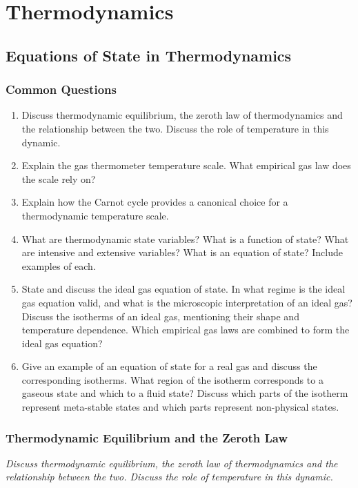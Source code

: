 \documentclass[11pt, a4paper]{article}
\begin{document}
\fi
\newpage

\pagestyle{headerstyle}
\section{Thermodynamics}

\subsection{Equations of State in Thermodynamics}
\subsubsection{Common Questions}
\begin{enumerate}
    \item Discuss thermodynamic equilibrium, the zeroth law of thermodynamics and the relationship between the two. Discuss the role of temperature in this dynamic. 
    \item Explain the gas thermometer temperature scale. What empirical gas law does the scale rely on?

    \item Explain how the Carnot cycle provides a canonical choice for a thermodynamic temperature scale.

    \item What are thermodynamic state variables? What is a function of state? What are intensive and extensive variables? What is an equation of state? Include examples of each.

    \item State and discuss the ideal gas equation of state. In what regime is the ideal gas equation valid, and what is the microscopic interpretation of an ideal gas? Discuss the isotherms of an ideal gas, mentioning their shape and temperature dependence. Which empirical gas laws are combined to form the ideal gas equation?

    \item Give an example of an equation of state for a real gas and discuss the corresponding isotherms. What region of the isotherm corresponds to a gaseous state and which to a fluid state? Discuss which parts of the isotherm represent meta-stable states and which parts represent non-physical states.
\end{enumerate}

\subsubsection{Thermodynamic Equilibrium and the Zeroth Law}
\textit{Discuss thermodynamic equilibrium, the zeroth law of thermodynamics and the relationship between the two. Discuss the role of temperature in this dynamic.}
\end{document}
